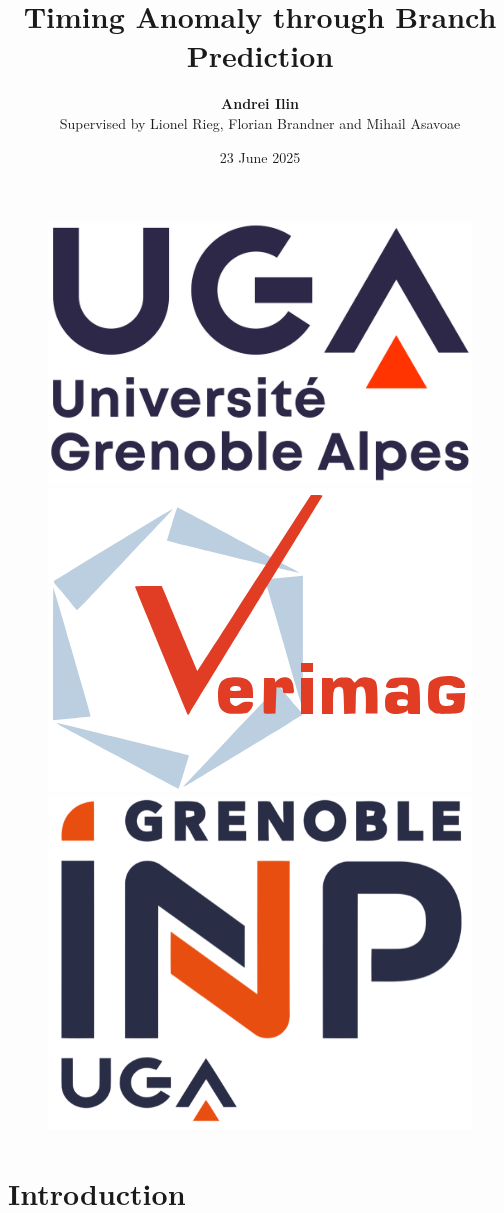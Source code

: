 \documentclass{beamer}
\author{\textbf{Andrei Ilin} \\ Supervised by Lionel Rieg, Florian Brandner and Mihail Asavoae}
\title{Timing Anomaly through Branch Prediction}
\subtitle{}
\institute{Université Grenoble Alpes}
\date{23 June 2025}
\begin{document}


\renewcommand{\figurename}{Fig.}

\begin{frame}[label=current]
    \titlepage
    \begin{figure}[htpb]
        \begin{center}
            \includegraphics[width=0.2\linewidth]{pic/logo-uga.png}\hspace{1.5cm}
            \includegraphics[width=0.2\linewidth]{pic/logo-verimag.png}\hspace{1.5cm}
            \includegraphics[width=0.2\linewidth]{pic/logo-INP.png}
        \end{center}
    \end{figure}
\end{frame}


\section{Introduction}
\end{document}
